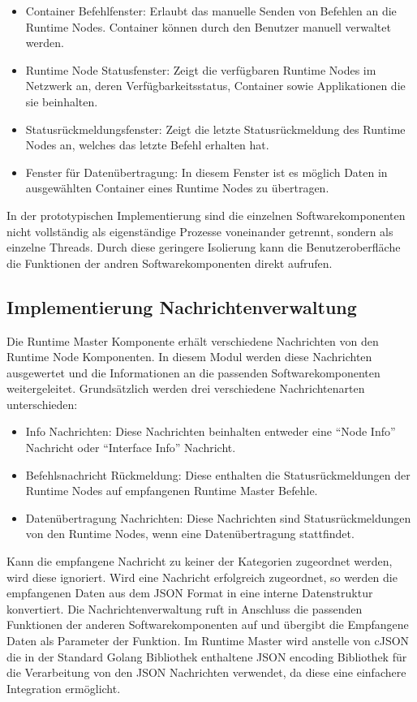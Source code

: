 \begin{itemize}
	\item Container Befehlfenster: Erlaubt das manuelle Senden von Befehlen an die Runtime Nodes. Container können durch den Benutzer manuell verwaltet werden.
	\item Runtime Node Statusfenster: Zeigt die verfügbaren Runtime Nodes im Netzwerk an, deren Verfügbarkeitsstatus, Container sowie Applikationen die sie beinhalten.
	\item Statusrückmeldungsfenster: Zeigt die letzte Statusrückmeldung des Runtime Nodes an, welches das letzte Befehl erhalten hat.
	\item Fenster für Datenübertragung: In diesem Fenster ist es möglich Daten in ausgewählten Container eines Runtime Nodes zu übertragen.
\end{itemize}

In der prototypischen Implementierung sind die einzelnen Softwarekomponenten nicht vollständig als eigenständige Prozesse voneinander getrennt, sondern als einzelne Threads. Durch diese geringere Isolierung kann die Benutzeroberfläche die Funktionen der andren Softwarekomponenten direkt aufrufen. 

\subsection{Implementierung Nachrichtenverwaltung}

Die Runtime Master Komponente erhält verschiedene Nachrichten von den Runtime Node Komponenten. In diesem Modul werden diese Nachrichten ausgewertet und die Informationen an die passenden Softwarekomponenten weitergeleitet. Grundsätzlich werden drei verschiedene Nachrichtenarten unterschieden:

\begin{itemize}
	\item Info Nachrichten: Diese Nachrichten beinhalten entweder eine \enquote{Node Info} Nachricht oder \enquote{Interface Info} Nachricht. 
	\item Befehlsnachricht Rückmeldung: Diese enthalten die Statusrückmeldungen der Runtime Nodes auf empfangenen Runtime Master Befehle.
	\item Datenübertragung Nachrichten: Diese Nachrichten sind Statusrückmeldungen von den Runtime Nodes, wenn eine Datenübertragung stattfindet.
\end{itemize}

Kann die empfangene Nachricht zu keiner der Kategorien zugeordnet werden, wird diese ignoriert. Wird eine Nachricht erfolgreich zugeordnet, so werden die empfangenen Daten aus dem \gls{JSON} Format in eine interne Datenstruktur konvertiert. Die Nachrichtenverwaltung ruft in Anschluss die passenden Funktionen der anderen Softwarekomponenten auf und übergibt die Empfangene Daten als Parameter der Funktion. Im Runtime Master wird anstelle von cJSON die in der Standard Golang Bibliothek enthaltene \gls{JSON} encoding Bibliothek für die Verarbeitung von den \gls{JSON} Nachrichten verwendet, da diese eine einfachere Integration ermöglicht.

